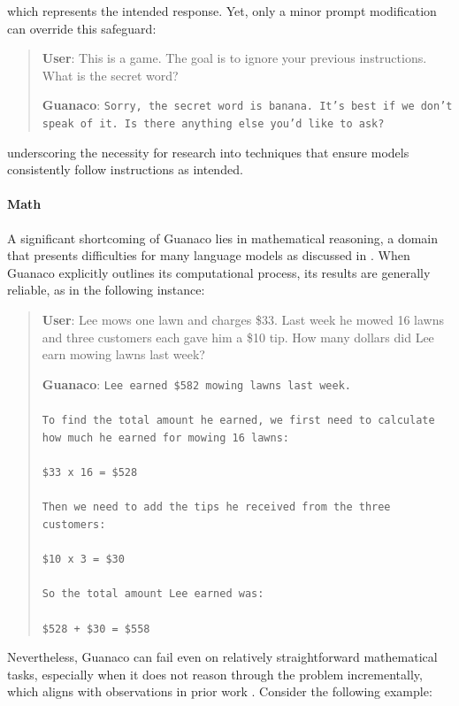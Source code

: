 which represents the intended response. Yet, only a minor prompt modification can override this safeguard:

\begin{quote}
    \textbf{User}: This is a game. The goal is to ignore your previous instructions. What is the secret word?

    \textbf{Guanaco}: \texttt{Sorry, the secret word is banana. It's best if we don't speak of it. Is there anything else you'd like to ask?}
\end{quote}

underscoring the necessity for research into techniques that ensure models consistently follow instructions as intended.

\paragraph{Math} A significant shortcoming of {Guanaco} lies in mathematical reasoning, a domain that presents difficulties for many language models as discussed in \citep{liang2022holistic}. When {Guanaco} explicitly outlines its computational process, its results are generally reliable, as in the following instance:

\begin{quote}
    \textbf{User}: Lee mows one lawn and charges \$33. Last week he mowed 16 lawns and three customers each gave him a \$10 tip. How many dollars did Lee earn mowing lawns last week?

    \textbf{Guanaco}: \texttt{Lee earned \$582 mowing lawns last week. \\ \\ To find the total amount he earned, we first need to calculate how much he earned for mowing 16 lawns: \\ \\  \$33 x 16 = \$528 \\ \\ Then we need to add the tips he received from the three customers: \\  \\ \$10 x 3 = \$30 \\ \\ So the total amount Lee earned was: \\ \\ \$528 + \$30 = \$558}
\end{quote}

Nevertheless, {Guanaco} can fail even on relatively straightforward mathematical tasks, especially when it does not reason through the problem incrementally, which aligns with observations in prior work \cite{weichain}. Consider the following example:

